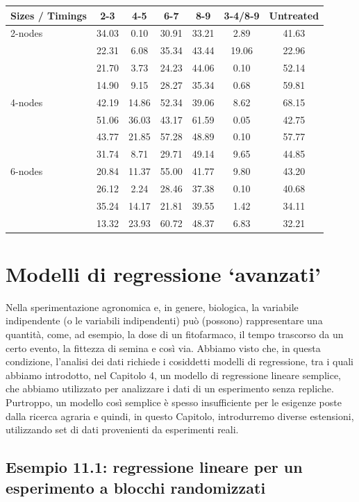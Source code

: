 \documentclass[
  12pt,
]{book}
\begin{document}
\begin{longtable}[]{@{}lcccccc@{}}
\toprule()
Sizes / Timings & 2-3 & 4-5 & 6-7 & 8-9 & 3-4/8-9 & Untreated \\
\midrule()
\endhead
2-nodes & 34.03 & 0.10 & 30.91 & 33.21 & 2.89 & 41.63 \\
& 22.31 & 6.08 & 35.34 & 43.44 & 19.06 & 22.96 \\
& 21.70 & 3.73 & 24.23 & 44.06 & 0.10 & 52.14 \\
& 14.90 & 9.15 & 28.27 & 35.34 & 0.68 & 59.81 \\
4-nodes & 42.19 & 14.86 & 52.34 & 39.06 & 8.62 & 68.15 \\
& 51.06 & 36.03 & 43.17 & 61.59 & 0.05 & 42.75 \\
& 43.77 & 21.85 & 57.28 & 48.89 & 0.10 & 57.77 \\
& 31.74 & 8.71 & 29.71 & 49.14 & 9.65 & 44.85 \\
6-nodes & 20.84 & 11.37 & 55.00 & 41.77 & 9.80 & 43.20 \\
& 26.12 & 2.24 & 28.46 & 37.38 & 0.10 & 40.68 \\
& 35.24 & 14.17 & 21.81 & 39.55 & 1.42 & 34.11 \\
& 13.32 & 23.93 & 60.72 & 48.37 & 6.83 & 32.21 \\
\bottomrule()
\end{longtable}

\hypertarget{modelli-di-regressione-avanzati}{%
\chapter{Modelli di regressione `avanzati'}\label{modelli-di-regressione-avanzati}}

Nella sperimentazione agronomica e, in genere, biologica, la variabile indipendente (o le variabili indipendenti) può (possono) rappresentare una quantità, come, ad esempio, la dose di un fitofarmaco, il tempo trascorso da un certo evento, la fittezza di semina e così via. Abbiamo visto che, in questa condizione, l'analisi dei dati richiede i cosiddetti modelli di regressione, tra i quali abbiamo introdotto, nel Capitolo 4, un modello di regressione lineare semplice, che abbiamo utilizzato per analizzare i dati di un esperimento senza repliche. Purtroppo, un modello così semplice è spesso insufficiente per le esigenze poste dalla ricerca agraria e quindi, in questo Capitolo, introdurremo diverse estensioni, utilizzando set di dati provenienti da esperimenti reali.

\hypertarget{esempio-11.1-regressione-lineare-per-un-esperimento-a-blocchi-randomizzati}{%
\section{Esempio 11.1: regressione lineare per un esperimento a blocchi randomizzati}\label{esempio-11.1-regressione-lineare-per-un-esperimento-a-blocchi-randomizzati}}
\end{document}
